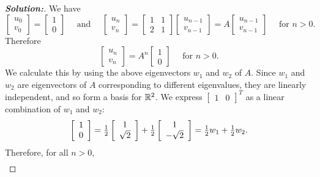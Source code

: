 \documentclass[a4paper]{amsart}
\theoremstyle{definition}
\newenvironment{solution}{\begin{proof}[\textbf{Solution:}] \vphantom{u}}{\end{proof}}
\begin{document}
\begin{solution}
 We have
 \[
 \left[ \begin{array}{c}u_{0}\\ v_0 \end{array} \right] =
 \left[ \begin{array}{c}1\\ 0 \end{array} \right]
 \quad \mbox{~and~} \quad
 \left[ \begin{array}{c}u_{n}\\ v_{n} \end{array} \right] =
 \left[ \begin{array}{cc} 1 & 1 \\ 2 & 1 \end{array} \right]
 \left[ \begin{array}{c}u_{n-1}\\ v_{n-1} \end{array} \right] =
 A\left[ \begin{array}{c}u_{n-1}\\ v_{n-1} \end{array} \right]
 \quad\textrm{\ for\ } n>0.
 \]
 Therefore
 \[
 \left[ \begin{array}{c}u_{n}\\ v_{n} \end{array} \right] =
 A^{n} \left[\begin{array}{c}1\\ 0 \end{array} \right]
 \quad\textrm{\ for\ } n>0.
 \]
 We calculate this by using the above eigenvectors $w_1$ and $w_2$ of
 $A$. Since $w_1$ and $w_2$ are eigenvectors of $A$ corresponding to
 different eigenvalues, they are linearly independent, and so form a
 basis for ${\mathbb{R}}^2$.
 We express
 $\left[ \begin{array}{cc}1&0 \end{array} \right]^T$
 as a linear combination of $w_1$ and $w_2$:
 \[
 \left[ \begin{array}{c}1\\ 0 \end{array} \right] =
 {\textstyle \tfrac{1}{2} \left[ \begin{array}{c}1\\ \sqrt{2} \end{array} \right] +
 \tfrac{1}{2} \left[ \begin{array}{c}1\\ -\sqrt{2} \end{array} \right] =
 \tfrac{1}{2} w_1 + \tfrac{1}{2} w_2}.
 \]
 Therefore, for all $n > 0$,
 \begin{align*}

\end{align*}
\end{solution}
\end{document}
